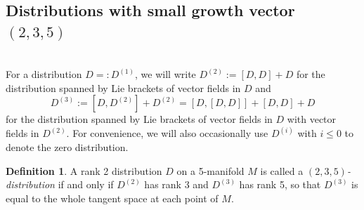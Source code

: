 \documentclass[12pt,a4paper]{amsart}
\makeatletter
\theoremstyle{definition}
\newtheorem{definition}[theorem]{Definition}
\newcommand{\Zhe}{\mathord{\mathchoice{\mbox{\fontsize\tf@size\z@\usefont{T2A}{\rmdefault}{m}{n}{\CYRZH}}}{\mbox{\fontsize\tf@size\z@\usefont{T2A}{\rmdefault}{m}{n}{\CYRZH}}}{\mbox{\fontsize\sf@size\z@\usefont{T2A}{\rmdefault}{m}{n}{\CYRZH}}}{\mbox{\fontsize\ssf@size\z@\usefont{T2A}{\rmdefault}{m}{n}{\CYRZH}}}}}
\makeatother
\begin{document}


\subsection{Distributions with small growth vector \texorpdfstring{$(2,3,5)$}{(2,3,5)}}\hfill \\
For a distribution $D=:D^{(1)}$, we will write $D^{(2)}:=[D,D]+D$ for the distribution spanned by Lie brackets of vector fields in $D$ and
\[D^{(3)}:=[D,D^{(2)}]+D^{(2)}=[D,[D,D]]+[D,D]+D\]
for the distribution spanned by Lie brackets of vector fields in $D$ with vector fields in $D^{(2)}$. For convenience, we will also occasionally use $D^{(i)}$ with $i\leq 0$ to denote the zero distribution.

\begin{definition}A rank 2 distribution $D$ on a 5-manifold $M$ is called a \emph{$(2,3,5)$-distribution} if and only if $D^{(2)}$ has rank 3 and $D^{(3)}$ has rank 5, so that $D^{(3)}$ is equal to the whole tangent space at each point of $M$.\end{definition}
\end{document}
